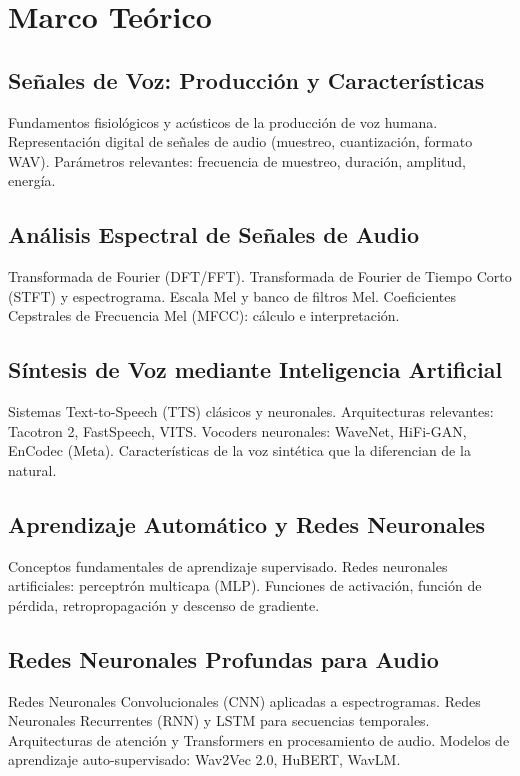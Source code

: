 \section{Marco Teórico}

\subsection{Señales de Voz: Producción y Características}
\label{sec:mt_voz}
Fundamentos fisiológicos y acústicos de la producción de voz humana. Representación digital de señales de audio (muestreo, cuantización, formato WAV). Parámetros relevantes: frecuencia de muestreo, duración, amplitud, energía.
 
\subsection{Análisis Espectral de Señales de Audio}
\label{sec:mt_espectral}
Transformada de Fourier (DFT/FFT). Transformada de Fourier de Tiempo Corto (STFT) y espectrograma. Escala Mel y banco de filtros Mel. Coeficientes Cepstrales de Frecuencia Mel (MFCC): cálculo e interpretación.

\subsection{Síntesis de Voz mediante Inteligencia Artificial}
\label{sec:mt_tts}
Sistemas Text-to-Speech (TTS) clásicos y neuronales. Arquitecturas relevantes: Tacotron 2, FastSpeech, VITS. Vocoders neuronales: WaveNet, HiFi-GAN, EnCodec (Meta). Características de la voz sintética que la diferencian de la natural.
 
\subsection{Aprendizaje Automático y Redes Neuronales}
\label{sec:mt_ml}
Conceptos fundamentales de aprendizaje supervisado. Redes neuronales artificiales: perceptrón multicapa (MLP). Funciones de activación, función de pérdida, retropropagación y descenso de gradiente.
 
\subsection{Redes Neuronales Profundas para Audio}
\label{sec:mt_dnn}
Redes Neuronales Convolucionales (CNN) aplicadas a espectrogramas. Redes Neuronales Recurrentes (RNN) y LSTM para secuencias temporales. Arquitecturas de atención y Transformers en procesamiento de audio. Modelos de aprendizaje auto-supervisado: Wav2Vec 2.0, HuBERT, WavLM.
 
